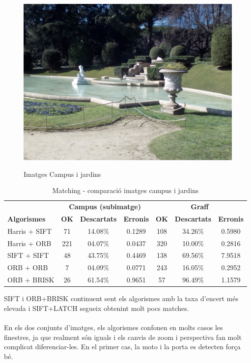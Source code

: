 \begin{figure}[!htb]
				\label{fig:awesome_image3}
			\endminipage\hfill
				\includegraphics[width=\linewidth]{images/experiments/jardi2}
				\label{fig:awesome_image3}
			\endminipage
			\caption{Imatges Campus i jardins}
		\end{figure}

		\begin{table}[H]
			\begin{center}
				\begin{tabular}{l | c c c | c c c}
					& \multicolumn{3}{c|}{\textbf{Campus (subimatge)}} & \multicolumn{3}{c}{\textbf{Graff}} \\
					\textbf{Algorismes} & \textbf{OK} & \textbf{Descartats} & \textbf{Erronis} & \textbf{OK} & \textbf{Descartats} & \textbf{Erronis} \\ \hline
					Harris + SIFT & 71 & 14.08\% & 0.1289 & 108 & 34.26\% & 0.5980 \\
					Harris + ORB & 221 & 04.07\% & 0.0437 & 320 & 10.00\% & 0.2816 \\
					SIFT + SIFT & 48 & 43.75\% & 0.4469 & 138 & 69.56\% & 7.9518 \\
					ORB + ORB & 7 & 04.09\% & 0.0771 & 243 & 16.05\% & 0.2952 \\
					ORB + BRISK & 26 & 61.54\% & 0.9651 & 57 & 96.49\% & 1.1579 \\
				\end{tabular}
			\end{center}
			\caption{Matching - comparació imatges campus i jardins}
		\end{table}
		\noindent
		SIFT i ORB+BRISK continuent sent els algorismes amb la taxa d'encert més elevada i SIFT+LATCH segueix obtenint molt pocs matches.\\\\
		En els dos conjunts d'imatges, els algorismes confonen en molts casos
		les finestres, ja que realment són iguals i els canvis de zoom i perspectiva fan molt complicat diferenciar-les. En el primer cas, la moto i la porta es detecten força bé.

